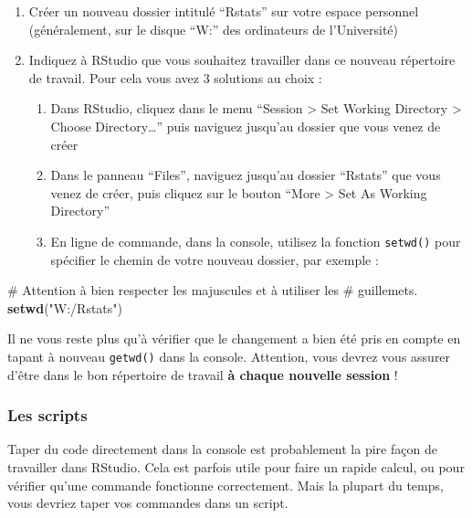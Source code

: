 \documentclass[
  a4paper,
]{article}
\newenvironment{Shaded}{\begin{snugshade}}{\end{snugshade}}
\newcommand{\CommentTok}[1]{\textcolor[rgb]{0.54,0.53,0.53}{#1}}
\newcommand{\KeywordTok}[1]{\textcolor[rgb]{0.12,0.11,0.11}{\textbf{#1}}}
\newcommand{\NormalTok}[1]{\textcolor[rgb]{0.12,0.11,0.11}{#1}}
\newcommand{\StringTok}[1]{\textcolor[rgb]{0.75,0.01,0.01}{#1}}
\providecommand{\tightlist}{%
  \setlength{\itemsep}{0pt}\setlength{\parskip}{0pt}}
\begin{document}
\begin{enumerate}
\def\labelenumi{\arabic{enumi}.}
\tightlist
\item
  Créer un nouveau dossier intitulé ``Rstats'' sur votre espace personnel (généralement, sur le disque ``W:'' des ordinateurs de l'Université)
\item
  Indiquez à RStudio que vous souhaitez travailler dans ce nouveau répertoire de travail. Pour cela vous avez 3 solutions au choix :

  \begin{enumerate}
  \def\labelenumii{\arabic{enumii}.}
  \tightlist
  \item
    Dans RStudio, cliquez dans le menu ``Session \textgreater{} Set Working Directory \textgreater{} Choose Directory\ldots{}'' puis naviguez jusqu'au dossier que vous venez de créer
  \item
    Dans le panneau ``Files'', naviguez jusqu'au dossier ``Rstats'' que vous venez de créer, puis cliquez sur le bouton ``More \textgreater{} Set As Working Directory''
  \item
    En ligne de commande, dans la console, utilisez la fonction \texttt{setwd()} pour spécifier le chemin de votre nouveau dossier, par exemple :
  \end{enumerate}
\end{enumerate}

\begin{Shaded}
\begin{Highlighting}[]
\CommentTok{# Attention à bien respecter les majuscules et à utiliser les}
\CommentTok{# guillemets.}
\KeywordTok{setwd}\NormalTok{(}\StringTok{"W:/Rstats"}\NormalTok{)}
\end{Highlighting}
\end{Shaded}

Il ne vous reste plus qu'à vérifier que le changement a bien été pris en compte en tapant à nouveau \texttt{getwd()} dans la console. Attention, vous devrez vous assurer d'être dans le bon répertoire de travail \textbf{à chaque nouvelle session} !

\hypertarget{les-scripts}{%
\subsubsection{Les scripts}\label{les-scripts}}

Taper du code directement dans la console est probablement la pire façon de travailler dans RStudio. Cela est parfois utile pour faire un rapide calcul, ou pour vérifier qu'une commande fonctionne correctement. Mais la plupart du temps, vous devriez taper vos commandes dans un script.
\end{document}
